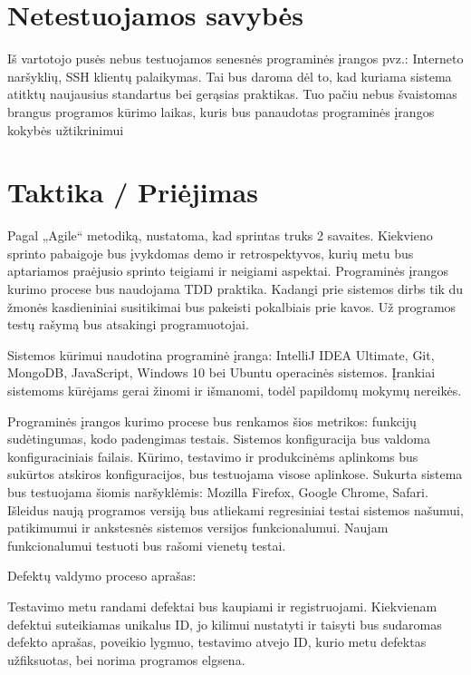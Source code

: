 \documentclass{VUMIFPSkursinis}
\begin{document}
    \section{Netestuojamos savybės}

    Iš vartotojo pusės nebus testuojamos senesnės programinės įrangos pvz.: Interneto naršyklių, SSH klientų palaikymas.
    Tai bus daroma dėl to, kad kuriama sistema atitktų naujausius standartus bei gerąsias praktikas.
    Tuo pačiu nebus švaistomas brangus programos kūrimo laikas, kuris bus panaudotas programinės įrangos kokybės užtikrinimui


    \section{Taktika / Priėjimas}

    Pagal „Agile“ metodiką, nustatoma, kad sprintas truks 2 savaites.
    Kiekvieno sprinto pabaigoje bus įvykdomas demo ir retrospektyvos,
     kurių metu bus aptariamos praėjusio sprinto teigiami ir neigiami aspektai.
    Programinės įrangos kurimo procese bus naudojama TDD praktika.
    Kadangi prie sistemos dirbs tik du žmonės kasdieniniai susitikimai bus pakeisti pokalbiais prie kavos.
    Už programos testų rašymą bus atsakingi programuotojai.


    Sistemos kūrimui naudotina programinė įranga: IntelliJ IDEA Ultimate, Git, MongoDB, JavaScript, Windows 10 bei Ubuntu operacinės sistemos.
    Įrankiai sistemoms kūrėjams gerai žinomi ir išmanomi, todėl papildomų mokymų nereikės. 

    Programinės įrangos kurimo procese bus renkamos šios metrikos: funkcijų sudėtingumas, kodo padengimas testais.
    Sistemos konfiguracija bus valdoma konfiguraciniais failais.
	Kūrimo, testavimo ir produkcinėms aplinkoms bus sukūrtos atskiros konfiguracijos, bus testuojama visose aplinkose.
    Sukurta sistema bus testuojama šiomis naršyklėmis: Mozilla Firefox, Google Chrome, Safari.
    Išleidus naują programos versiją bus atliekami regresiniai testai sistemos našumui,
     patikimumui ir ankstesnės sistemos versijos funkcionalumui.
    Naujam funkcionalumui testuoti bus rašomi vienetų testai. 

    Defektų valdymo proceso aprašas:

    Testavimo metu randami defektai bus kaupiami ir registruojami. 
    Kiekvienam defektui suteikiamas unikalus ID, jo kilimui nustatyti ir taisyti bus sudaromas defekto aprašas, poveikio lygmuo, 
     testavimo atvejo ID, kurio metu defektas užfiksuotas, bei norima programos elgsena.
\end{document}
